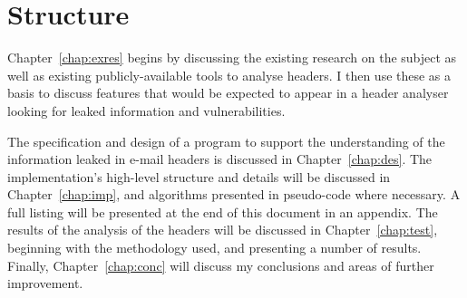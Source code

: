 \documentclass[a4paper,DIV=11,BCOR=7mm,abstract=yes,twoside,10pt]{scrreprt}
\begin{document}
\section{Structure}

Chapter~\ref{chap:exres} begins by discussing the existing research on
the subject as well as existing publicly-available tools to analyse
headers.  I then use these as a basis to discuss features that would be
expected to appear in a header analyser looking for leaked information
and vulnerabilities.

The specification and design of a program to support the understanding of the
information leaked in e-mail headers is discussed in Chapter~\ref{chap:des}.
The implementation's high-level structure and details will be discussed in
Chapter~\ref{chap:imp}, and algorithms presented in pseudo-code where
necessary.  A full listing will be presented at the end of this document in
an appendix. The results of the analysis of the headers will be discussed in
Chapter~\ref{chap:test}, beginning with the methodology used, and presenting
a number of results. Finally, Chapter~\ref{chap:conc} will discuss my
conclusions and areas of further improvement.

\cleardoublepage  
\cleardoublepage  
\cleardoublepage 
\cleardoublepage  
\cleardoublepage 
\cleardoublepage \printbibliography{} 
\end{document}
